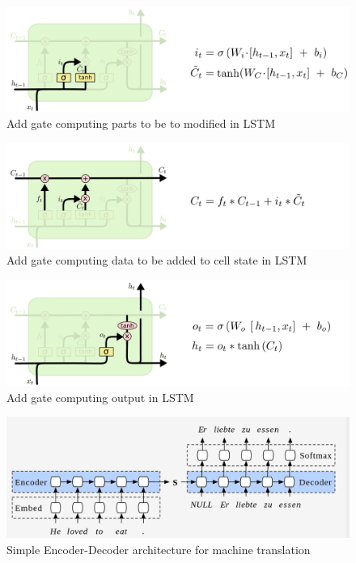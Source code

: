 \documentclass[a4paper]{article}
\begin{document}
\begin{figure}
  \includegraphics[width=.99\linewidth]{img/lstm_add.png}
  \caption{Add gate computing parts to be to modified in LSTM}
  \label{fig:lstm_add}
\end{figure}


\begin{figure}
  \includegraphics[width=.99\linewidth]{img/lstm_add1.png}
  \caption{Add gate computing data to be added to cell state in LSTM}
  \label{fig:lstm_add1}
\end{figure}


\begin{figure}
  \includegraphics[width=.99\linewidth]{img/lstm_output.png}
  \caption{Add gate computing output in LSTM}
  \label{fig:lstm_output}
\end{figure}


\begin{figure}
  \includegraphics[width=.99\linewidth]{img/enc_dec.png}
  \caption{Simple Encoder-Decoder architecture for machine translation}
  \label{fig:enc_dec}
\end{figure}
\end{document}
